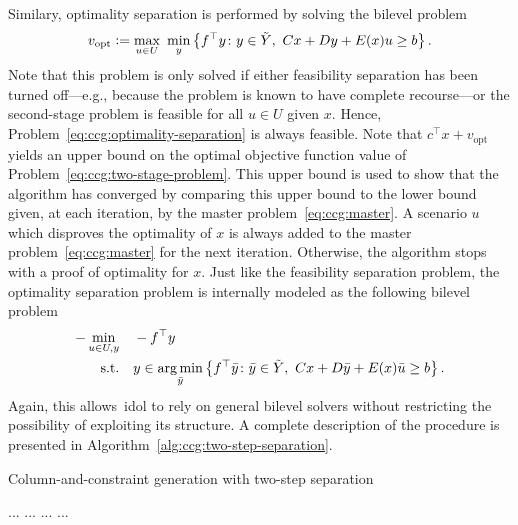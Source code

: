 Similary, optimality separation is performed by solving the bilevel problem
\begin{equation}
    \label{eq:ccg:optimality-separation}
    v_\text{opt} \mathrel{{\mathop:}{=}}
    \max_{u\in U} \ \min_{y} \left\{ f^\top y \colon
        y\in\tilde{Y}, \ Cx + Dy + E(x)u \ge b
    \right\}.
\end{equation}
Note that this problem is only solved if either feasibility separation has
been turned off---e.g., because the problem is known to have complete
recourse---or the second-stage problem is feasible for all $u\in U$ given $x$.
Hence, Problem~\eqref{eq:ccg:optimality-separation} is always feasible. Note
that $c^\top x + v_\text{opt}$ yields an upper bound on the optimal objective
function value of Problem~\eqref{eq:ccg:two-stage-problem}. This upper bound
is used to show that the algorithm has converged by comparing this upper bound
to the lower bound given, at each iteration, by the master
problem~\eqref{eq:ccg:master}. A scenario $u$ which disproves the optimality
of $x$ is always added to the master problem~\eqref{eq:ccg:master} for the
next iteration. Otherwise, the algorithm stops with a proof of optimality for
$x$. Just like the feasibility separation problem, the optimality separation
problem is internally modeled as the following bilevel problem
%
\begin{align*}
    - \min_{u\in U,y} \quad & -f^\top y \\
    \text{s.t.} \quad & y \in \operatorname*{arg\,min}_{\bar{y}} \left\{ f^\top \bar{y} \colon
        \bar{y}\in\tilde{Y}, \ Cx + D\bar{y} + E(x)\bar{u} \ge b
    \right\}.
\end{align*}
Again, this allows~\textsf{idol} to rely on general bilevel solvers without
restricting the possibility of exploiting its structure. A complete
description of the procedure is presented in
Algorithm~\ref{alg:ccg:two-step-separation}.

\begin{algorithm}
    \caption{Column-and-constraint generation with two-step separation}
    \label{alg:ccg:two-step-separation}
    \begin{algorithmic}[1]
        \State ...
        \While {}
        \State ...
            \State ... 
        \EndIf
        \State ...
        \EndWhile
    \end{algorithmic}
\end{algorithm}

